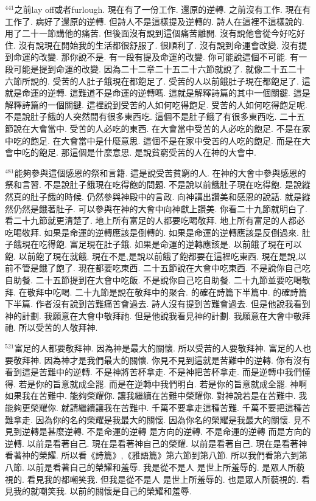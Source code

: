 \documentclass{book}
\begin{document}
$^{441}$之前lay off或者furlough.
現在有了一份工作.
還原的逆轉.
之前沒有工作.
現在有工作了.
病好了還原的逆轉.
但詩人不是這樣提及逆轉的.
詩人在這裡不這樣說的.
用了二十一節講他的痛苦.
但後面沒有說到這個痛苦離開.
沒有說他會從今好吃好住.
沒有說現在開始我的生活都很舒服了.
很順利了.
沒有說到命運會改變.
沒有提到命運的改變.
那你說不是.
有一段有提及命運的改變.
你可能說這個不可能.
有一段可能是提到命運的改變.
因為二十二章二十五二十六節就說了.
就像二十五二十六節所說的.
受苦的人肚子餓現在都飽足了.
受苦的人以前餓肚子現在都飽足了.
這就是命運的逆轉.
這難道不是命運的逆轉嗎.
這就是解釋詩篇的其中一個關鍵.
這是解釋詩篇的一個關鍵.
這裡說到受苦的人如何吃得飽足.
受苦的人如何吃得飽足呢.
不是說肚子餓的人突然間有很多東西吃.
這個不是肚子餓了有很多東西吃.
二十五節說在大會當中.
受苦的人必吃的東西.
在大會當中受苦的人必吃的飽足.
不是在家中吃的飽足.
在大會當中是什麼意思.
這個不是在家中受苦的人吃的飽足.
而是在大會中吃的飽足.
那這個是什麼意思.
是說貧窮受苦的人在神的大會中.

$^{481}$能夠參與這個感恩的祭和言籍.
這是說受苦貧窮的人.
在神的大會中參與感恩的祭和言習.
不是說肚子餓現在吃得飽的問題.
不是說以前餓肚子現在吃得飽.
是說縱然真的肚子餓的時候.
仍然參與神殿中的言政.
向神講出讚美和感恩的說話.
就是縱然仍然是餓著肚子.
可以參與在神的大會中向神獻上讚美.
你看二十九節就明白了.
看二十九節就更清楚了.
地上所有富足的人都要吃喝敬拜.
地上所有富足的人都必吃喝敬拜.
如果是命運的逆轉應該是倒轉的.
如果是命運的逆轉應該是反倒過來.
肚子餓現在吃得飽.
富足現在肚子餓.
如果是命運的逆轉應該是.
以前餓了現在可以飽.
以前飽了現在就餓.
現在不是,是說以前餓了飽都要在這裡吃東西.
現在是說,以前不管是餓了飽了.
現在都要吃東西.
二十五節說在大會中吃東西.
不是說你自己吃自助餐.
二十五節提到在大會中吃飯.
不是說你自己吃自助餐.
二十九節並要吃喝敬拜.
在敬拜中吃喝.
二十九節是說在敬拜中的聚合.
的確在詩篇下半篇中.
的確詩篇下半篇.
作者沒有說到苦難痛苦會過去.
詩人沒有提到苦難會過去.
但是他說我看到神的計劃.
我願意在大會中敬拜祂.
但是他說我看見神的計劃.
我願意在大會中敬拜祂.
所以受苦的人敬拜神.

$^{521}$富足的人都要敬拜神.
因為神是最大的關懷.
所以受苦的人要敬拜神.
富足的人也要敬拜神.
因為神才是我們最大的關懷.
你見不見到這就是苦難中的逆轉.
你有沒有看到這是苦難中的逆轉.
不是神將苦杯拿走.
不是神把苦杯拿走.
而是逆轉中我們懂得.
若是你的旨意就成全罷.
而是在逆轉中我們明白.
若是你的旨意就成全罷.
神啊 如果我在苦難中.
能夠榮耀你.
讓我繼續在苦難中榮耀你.
對神說若是在苦難中.
我能夠更榮耀你.
就請繼續讓我在苦難中.
千萬不要拿走這種苦難.
千萬不要把這種苦難拿走.
因為你的名的榮耀是我最大的關懷.
因為你名的榮耀是我最大的關懷.
見不見到逆轉是甚麼逆轉.
不是命運的逆轉 是方向的逆轉.
不是命運的逆轉 而是方向的逆轉.
以前是看著自己.
現在是看著神自己的榮耀.
以前是看著自己.
現在是看著神 看著神的榮耀.
所以看《詩篇》,《雅語篇》第六節到第八節.
所以我們看第六到第八節.
以前是看著自己的榮耀和羞辱.
我是從不是人 是世上所羞辱的.
是眾人所藐視的.
看見我的都嘲笑我.
但我是從不是人 是世上所羞辱的.
也是眾人所藐視的.
看見我的就嘲笑我.
以前的關懷是自己的榮耀和羞辱.
\end{document}
